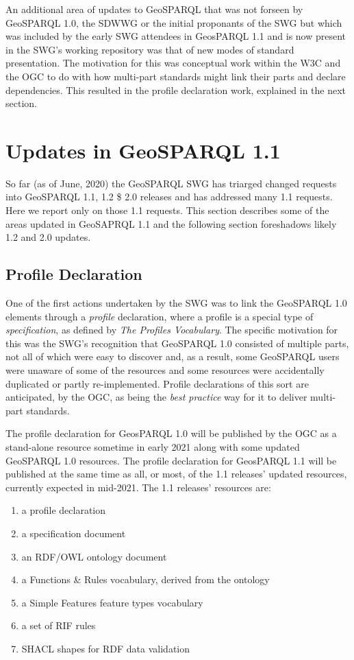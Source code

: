 \documentclass[runningheads]{llncs}
\begin{document}
An additional area of updates to GeoSPARQL that was not forseen by GeoSPARQL 1.0, the SDWWG or the initial proponants of the SWG
but which was included by the early SWG attendees in GeosPARQL 1.1 and is now present in the SWG's working repository was that 
of new modes of standard presentation. The motivation for this was conceptual work within the W3C and the OGC to do with how 
multi-part standards might link their parts and declare dependencies. This resulted in the profile declaration work, explained 
in the next section.


\section{Updates in GeoSPARQL 1.1}\label{sec:newfeatures}
So far (as of June, 2020) the GeoSPARQL SWG has triarged changed requests into GeoSPARQL 1.1, 1.2 \$ 2.0 releases and has addressed
many 1.1 requests. Here we report only on those 1.1 requests. This section describes some of the areas updated in GeoSAPRQL 1.1
and the following section foreshadows likely 1.2 and 2.0 updates.

\subsection{Profile Declaration}\label{sec:profiledec}
One of the first actions undertaken by the SWG was to link the GeoSPARQL 1.0 elements through a \textit{profile} 
declaration, where a profile is a special type of \textit{specification}, as defined by \textit{The Profiles Vocabulary}\cite{atkinson_profiles_2020}. 
The specific motivation for this was the SWG's recognition that GeoSPARQL 1.0 consisted of multiple parts, not all
of which were easy to discover and, as a result, some GeoSPARQL users were unaware of some of the resources and some
resources were accidentally duplicated or partly re-implemented. Profile declarations of this sort are anticipated, by the OGC, 
as being the \textit{best practice} way for it to deliver multi-part standards.

The profile declaration for GeosPARQL 1.0 will be published by the OGC as a stand-alone resource sometime in early 2021 along with some 
updated GeoSPARQL 1.0 resources. The profile declaration for GeosPARQL 1.1 will be published at the same time as all, or most, of the 
1.1 releases' updated resources, currently expected in mid-2021. The 1.1 releases' resources are:

\begin{enumerate}
    \item a profile declaration
    \item a specification document
    \item an RDF/OWL ontology document
    \item a Functions \& Rules vocabulary, derived from the ontology
    \item a Simple Features feature types vocabulary
    \item a set of RIF\cite{kifer2013rif} rules
    \item SHACL\cite{knublauch_shapes_2017} shapes for RDF data validation 
\end{enumerate}
\end{document}
